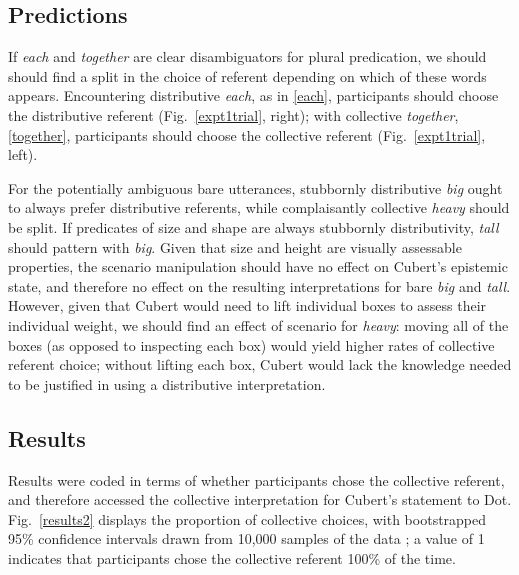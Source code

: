 \documentclass[preprint,12pt,authoryear,titlepage]{elsarticle}
\begin{document}
\subsection{Predictions}

If \emph{each} and \emph{together} are clear disambiguators for plural predication, we should should find a split in the choice of referent depending on which of these words appears. Encountering distributive \emph{each}, as in \ref{each}, participants should choose the distributive referent (Fig.~\ref{expt1trial}, right); with collective \emph{together}, \ref{together}, participants should choose the collective referent (Fig.~\ref{expt1trial}, left). 

For the potentially ambiguous bare utterances, stubbornly distributive \emph{big} ought to always prefer distributive referents, while complaisantly collective \emph{heavy} should be split. If predicates of size and shape are always stubbornly distributivity, \emph{tall} should pattern with \emph{big}. Given that size and height are visually assessable properties, the scenario manipulation should have no effect on Cubert's epistemic state, and therefore no effect on the resulting interpretations for bare \emph{big} and \emph{tall}. 
However, given that Cubert would need to lift individual boxes to assess their individual weight, we should find an effect of scenario for \emph{heavy}: moving all of the boxes (as opposed to inspecting each box) would yield higher rates of collective referent choice; without lifting each box, Cubert would lack the knowledge needed to be justified in using a distributive interpretation.

\subsection{Results}

Results were coded in terms of whether participants chose the collective referent, and therefore accessed the collective interpretation for Cubert's statement to Dot. Fig.\ \ref{results2} displays the proportion of collective choices, with bootstrapped 95\% confidence intervals drawn from 10,000 samples of the data \citep{diciccioefron1996}; a value of 1 indicates that participants chose the collective referent 100\% of the time.
\end{document}
